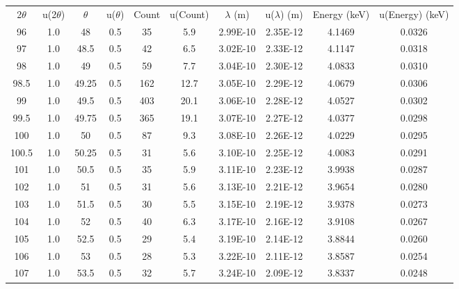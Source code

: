 \begin{maintable}[ht]
\center
\begin{tabular}{cccccccccc}
2$\theta$ & u(2$\theta$) & $\theta$ & u($\theta$) & Count & u(Count) & $\lambda$ (m) & u($\lambda$) (m) & Energy (keV) & u(Energy) (keV) \\
96        & 1.0 & 48       & 0.5         & 35    & 5.9      & 2.99E-10      & 2.35E-12         & 4.1469       & 0.0326 \\
97        & 1.0 & 48.5     & 0.5         & 42    & 6.5      & 3.02E-10      & 2.33E-12         & 4.1147       & 0.0318 \\
98        & 1.0 & 49       & 0.5         & 59    & 7.7      & 3.04E-10      & 2.30E-12         & 4.0833       & 0.0310 \\
98.5        & 1.0 & 49.25    & 0.5         & 162   & 12.7     & 3.05E-10      & 2.29E-12         & 4.0679       & 0.0306 \\
99        & 1.0 & 49.5     & 0.5         & 403   & 20.1     & 3.06E-10      & 2.28E-12         & 4.0527       & 0.0302 \\
99.5       & 1.0 & 49.75    & 0.5         & 365   & 19.1     & 3.07E-10      & 2.27E-12         & 4.0377       & 0.0298 \\
100       & 1.0 & 50       & 0.5         & 87    & 9.3      & 3.08E-10      & 2.26E-12         & 4.0229       & 0.0295 \\
100.5       & 1.0 & 50.25    & 0.5         & 31    & 5.6      & 3.10E-10      & 2.25E-12         & 4.0083       & 0.0291 \\
101       & 1.0 & 50.5     & 0.5         & 35    & 5.9      & 3.11E-10      & 2.23E-12         & 3.9938       & 0.0287 \\
102       & 1.0 & 51       & 0.5         & 31    & 5.6      & 3.13E-10      & 2.21E-12         & 3.9654       & 0.0280 \\
103       & 1.0 & 51.5     & 0.5         & 30    & 5.5      & 3.15E-10      & 2.19E-12         & 3.9378       & 0.0273 \\
104       & 1.0 & 52       & 0.5         & 40    & 6.3      & 3.17E-10      & 2.16E-12         & 3.9108       & 0.0267 \\
105       & 1.0 & 52.5     & 0.5         & 29    & 5.4      & 3.19E-10      & 2.14E-12         & 3.8844       & 0.0260 \\
106       & 1.0 & 53       & 0.5         & 28    & 5.3      & 3.22E-10      & 2.11E-12         & 3.8587       & 0.0254 \\
107       & 1.0 & 53.5     & 0.5         & 32    & 5.7      & 3.24E-10      & 2.09E-12         & 3.8337       & 0.0248 \\

\end{tabular}
\end{maintable}

